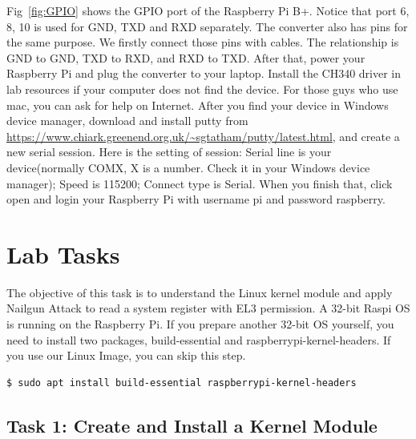 Fig~\ref{fig:GPIO} shows the GPIO port of the Raspberry Pi B+. Notice that port 6, 8, 10 is used for GND, TXD and RXD separately. The converter also has pins for the same purpose. We firstly connect those pins with cables. The relationship is GND to GND, TXD to RXD, and RXD to TXD. After that, power your Raspberry Pi and plug the converter to your laptop. Install the CH340 driver in lab resources if your computer does not find the device. For those guys who use mac, you can ask for help on Internet. After you find your device in Windows device manager, download and install putty from \url{https://www.chiark.greenend.org.uk/~sgtatham/putty/latest.html}, and create a new serial session. Here is the setting of session: Serial line is your device(normally COMX, X is a number. Check it in your Windows device manager); Speed is 115200; Connect type is Serial.
When you finish that, click open and login your Raspberry Pi with username pi and password raspberry. 


% 
\section{Lab Tasks}

The objective of this task is to understand the Linux kernel module and apply
Nailgun Attack to read a system register with EL3 permission. A 32-bit Raspi OS
is running on the Raspberry Pi. If you prepare another 32-bit OS yourself, you
need to install two packages, build-essential and raspberrypi-kernel-headers. If
you use our Linux Image, you can skip this step.

\begin{lstlisting}
$ sudo apt install build-essential raspberrypi-kernel-headers
\end{lstlisting}

\subsection{Task 1: Create and Install a Kernel Module}

